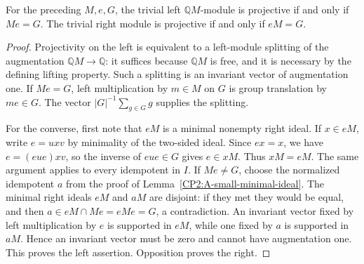 \begin{lemma}
\label{CP2:A-projectivity-test}
For the preceding $M,e,G$, the trivial left $\mathbb QM$-module is
projective if and only if $Me=G$. The trivial right module is
projective if and only if $eM=G$.
\end{lemma}
\begin{proof}
Projectivity on the left is equivalent to a left-module splitting
of the augmentation $\mathbb QM\to\mathbb Q$: it suffices because
$\mathbb QM$ is free, and it is necessary by the defining lifting
property. Such a splitting is an invariant vector of augmentation
one. If $Me=G$, left multiplication by $m\in M$ on $G$ is group
translation by $me\in G$. The vector
$|G|^{-1}\sum_{g\in G}g$ supplies the splitting.

For the converse, first note that $eM$ is a minimal nonempty right
ideal. If $x\in eM$, write $e=uxv$ by minimality of the two-sided
ideal. Since $ex=x$, we have $e=(eue)xv$, so the inverse of
$eue\in G$ gives $e\in xM$. Thus $xM=eM$. The same argument
applies to every idempotent in $I$.
If $Me\ne G$, choose the normalized idempotent $a$ from the proof
of Lemma~\ref{CP2:A-small-minimal-ideal}. The minimal right ideals
$eM$ and $aM$ are disjoint: if they met they would be equal, and
then $a\in eM\cap Me=eMe=G$, a contradiction.
An invariant vector fixed by left multiplication by $e$ is
supported in $eM$, while one fixed by $a$ is supported in $aM$.
Hence an invariant vector must be zero and cannot have augmentation
one. This proves the left assertion. Opposition proves the right.
\end{proof}

